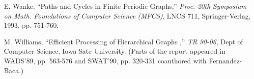 \begin{thebibliography}{HMRR93}
  E.  Wanke,
``Paths and Cycles in Finite Periodic Graphs,''
{\em Proc. 20th Symposium on Math. Foundations of Computer Science (MFCS)},
LNCS 711, Springer-Verlag, 1993, pp. 751-760.


	
 M. Williams,
``Efficient Processing of  Hierarchical Graphs ,''
 {\em TR 90-06}, Dept of Computer Science, Iowa Sate University. 
(Parts of the report appeared in WADS'89, pp. 563-576
and SWAT'90, pp. 320-331 coauthored with 
Fernandez-Baca.)

\end{thebibliography}
